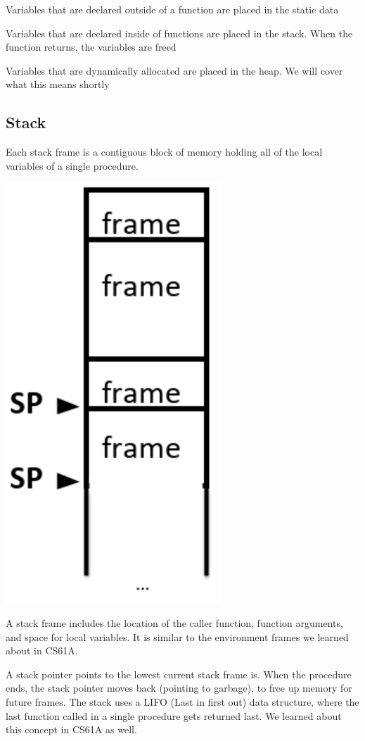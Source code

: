 \documentclass[letterpaper]{article}
\theoremstyle{remark}
\begin{document}
Variables that are declared outside of a function are placed in the static data

Variables that are declared inside of functions are placed in the stack. When the function returns, the variables are freed

Variables that are dynamically allocated are placed in the heap. We will cover what this means shortly

\subsection{Stack}
Each stack frame is a contiguous block of memory holding all of the local variables of a single procedure.

\begin{center}
    \includegraphics[scale=.5]{stack}
\end{center}

A stack frame includes the location of the caller function, function arguments, and space for local variables. It is similar to the environment frames we learned about in CS61A.

A stack pointer points to the lowest current stack frame is. When the procedure ends, the stack pointer moves back (pointing to garbage), to free up memory for future frames. The stack uses a LIFO (Last in first out) data structure, where the last function called in a single procedure gets returned last. We learned about this concept in CS61A as well.
\end{document}
